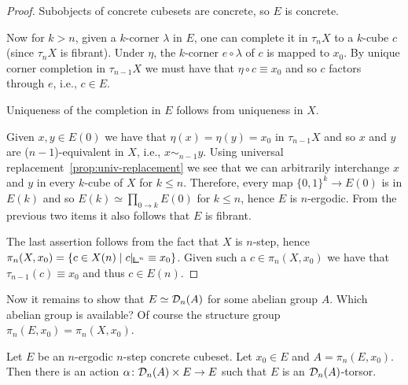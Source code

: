 \begin{proof}
Subobjects of concrete cubesets are concrete, so $E$ is concrete.

Now for $k>n$, given a $k$-corner $\lambda$ in $E$, one can complete it in $\tau_nX$ to a $k$-cube $c$ (since $\tau_nX$ is fibrant).
Under $\eta$, the $k$-corner $e\circ\lambda$ of $c$ is mapped to $x_0$.
By unique corner completion in $\tau_{n-1}X$ we must have that $\eta\circ c \equiv x_0$ and so $c$ factors through $e$, i.e., $c\in E$.
\begin{center}
\end{center}
Uniqueness of the completion in $E$ follows from uniqueness in $X$.

Given $x,y\in E(0)$ we have that $\eta(x) = \eta(y) = x_0$ in $\tau_{n-1}X$
and so $x$ and $y$ are ($n-1$)-equivalent in $X$, i.e., $x\sim_{n-1} y$.
Using universal replacement~\ref{prop:univ-replacement} we see that
we can arbitrarily interchange $x$ and $y$ in every $k$-cube of $X$ for $k\leq n$.
Therefore, every map $\{0,1\}^k\to E(0)$ is in $E(k)$ and so $E(k) \simeq \prod_{0\to k} E(0)$ for $k\leq n$,
hence $E$ is $n$-ergodic.
From the previous two items it also follows that $E$ is fibrant.

The last assertion follows from the fact that $X$ is $n$-step,
hence $\pi_n(X,x_0) = \{c\in X(n)\mid c\rvert_{{\bbcor}^n}\equiv x_0\}$.
Given such a $c\in\pi_n(X,x_0)$ we have that $\tau_{n-1}(c)\equiv x_0$ and thus $c\in E(n)$.
\end{proof}

Now it remains to show that $E\simeq\mathcal{D}_n(A)$ for some abelian group $A$.
Which abelian group is available? Of course the structure group $\pi_n(E,x_0) = \pi_n(X,x_0)$.

\begin{proposition}\label{prop:fiber-torsor}
Let $E$ be an $n$-ergodic $n$-step concrete cubeset.
Let $x_0\in E$ and $A = \pi_n(E,x_0)$.
Then there is an action $\alpha\colon\mathcal{D}_n(A)\times E\to E$ such that $E$ is an $\mathcal{D}_n(A)$-torsor.
\end{proposition}

